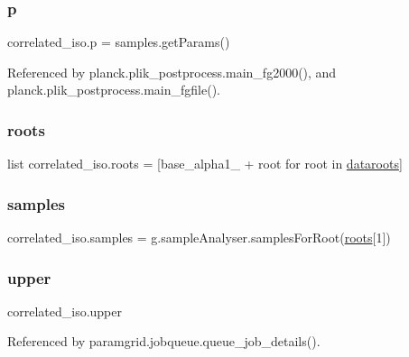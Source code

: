 \mbox{\label{namespacecorrelated__iso_a86bbbd91a8d05c528a27c55171666716}} 
\subsubsection{\texorpdfstring{p}{p}}
{\footnotesize\ttfamily correlated\+\_\+iso.\+p = samples.\+get\+Params()}



Referenced by planck.\+plik\+\_\+postprocess.\+main\+\_\+fg2000(), and planck.\+plik\+\_\+postprocess.\+main\+\_\+fgfile().

\mbox{\label{namespacecorrelated__iso_a085d55fb2097e66b8e0d80ca1e1da272}} 
\subsubsection{\texorpdfstring{roots}{roots}}
{\footnotesize\ttfamily list correlated\+\_\+iso.\+roots = \mbox{[}\textquotesingle{}base\+\_\+alpha1\+\_\+\textquotesingle{} + root for root in \mbox{\hyperlink{namespacecorrelated__iso_aaa9108be0fe35b0f16c6f3c603f22c58}{dataroots}}\mbox{]}}

\mbox{\label{namespacecorrelated__iso_ab1c43096ba8dd25890425ce47ea440d2}} 
\subsubsection{\texorpdfstring{samples}{samples}}
{\footnotesize\ttfamily correlated\+\_\+iso.\+samples = g.\+sample\+Analyser.\+samples\+For\+Root(\mbox{\hyperlink{namespacecorrelated__iso_a085d55fb2097e66b8e0d80ca1e1da272}{roots}}\mbox{[}1\mbox{]})}

\mbox{\label{namespacecorrelated__iso_a2e77214859088143ea01ab7589124fbe}} 
\subsubsection{\texorpdfstring{upper}{upper}}
{\footnotesize\ttfamily correlated\+\_\+iso.\+upper}



Referenced by paramgrid.\+jobqueue.\+queue\+\_\+job\+\_\+details().

